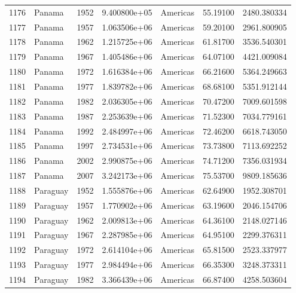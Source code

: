 \documentclass[
  letterpaper,
  DIV=11,
  numbers=noendperiod]{scrreprt}
\begin{document}
\begin{tabular}{llrrlrr}
1176 &                    Panama &  1952 &  9.400800e+05 &  Americas &  55.19100 &    2480.380334 \\
1177 &                    Panama &  1957 &  1.063506e+06 &  Americas &  59.20100 &    2961.800905 \\
1178 &                    Panama &  1962 &  1.215725e+06 &  Americas &  61.81700 &    3536.540301 \\
1179 &                    Panama &  1967 &  1.405486e+06 &  Americas &  64.07100 &    4421.009084 \\
1180 &                    Panama &  1972 &  1.616384e+06 &  Americas &  66.21600 &    5364.249663 \\
1181 &                    Panama &  1977 &  1.839782e+06 &  Americas &  68.68100 &    5351.912144 \\
1182 &                    Panama &  1982 &  2.036305e+06 &  Americas &  70.47200 &    7009.601598 \\
1183 &                    Panama &  1987 &  2.253639e+06 &  Americas &  71.52300 &    7034.779161 \\
1184 &                    Panama &  1992 &  2.484997e+06 &  Americas &  72.46200 &    6618.743050 \\
1185 &                    Panama &  1997 &  2.734531e+06 &  Americas &  73.73800 &    7113.692252 \\
1186 &                    Panama &  2002 &  2.990875e+06 &  Americas &  74.71200 &    7356.031934 \\
1187 &                    Panama &  2007 &  3.242173e+06 &  Americas &  75.53700 &    9809.185636 \\
1188 &                  Paraguay &  1952 &  1.555876e+06 &  Americas &  62.64900 &    1952.308701 \\
1189 &                  Paraguay &  1957 &  1.770902e+06 &  Americas &  63.19600 &    2046.154706 \\
1190 &                  Paraguay &  1962 &  2.009813e+06 &  Americas &  64.36100 &    2148.027146 \\
1191 &                  Paraguay &  1967 &  2.287985e+06 &  Americas &  64.95100 &    2299.376311 \\
1192 &                  Paraguay &  1972 &  2.614104e+06 &  Americas &  65.81500 &    2523.337977 \\
1193 &                  Paraguay &  1977 &  2.984494e+06 &  Americas &  66.35300 &    3248.373311 \\
1194 &                  Paraguay &  1982 &  3.366439e+06 &  Americas &  66.87400 &    4258.503604 \\

\end{tabular}
\end{document}
